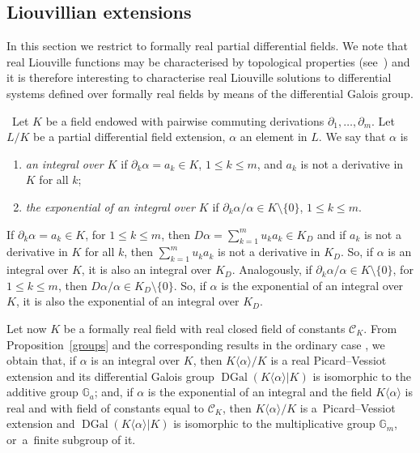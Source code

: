 \documentclass[10pt,a4paper]{amsart}
\numberwithin{equation}{section}
\newcommand{\G}{\mathbb{G}}
\def \DGal{\operatorname{DGal}}
\begin{document}
\subsection{Liouvillian extensions}\label{sLiou}

In this section we restrict to formally real partial differential fields. We note that real Liouville functions may be characterised by topological properties (see~\cite{GK}) and it is therefore interesting to characterise real Liouville solutions to differential systems defined over formally real fields by means of the differential Galois group.


\begin{Definition}\ Let $K$ be a field endowed with pairwise commuting derivations $\partial_1,\dots,\partial_m$. Let $L/K$ be a partial differential field extension, $\alpha$ an element in $L$. We say that $\alpha$ is
\begin{enumerate}\itemsep=0pt
\item[$-$] \emph{an integral over $K$} if $\partial_k \alpha = a_k \in K$, $1 \leq k \leq m$, and $a_k$ is not a derivative in $K$ for all $k$;
\item[$-$] \emph{the exponential of an integral over $K$} if $\partial_k \alpha/\alpha \in K\setminus \{0\}$, $1 \leq k \leq m$.
\end{enumerate}
\end{Definition}

\begin{Remark}\label{intexp}
If $\partial_k \alpha = a_k \in K$, for $1 \leq k \leq m$, then $D \alpha = \sum_{k=1}^m u_k a_k \in K_D$ and if $a_k$ is not a derivative in $K$ for all $k$, then $\sum_{k=1}^m u_k a_k$ is not a derivative in $K_D$. So, if $\alpha$ is an integral over $K$, it is also an integral over $K_D$. Analogously, if $\partial_k \alpha/\alpha \in K\setminus \{0\}$, for $1 \leq k \leq m$, then $D\alpha /\alpha \in K_D\setminus \{0\}$. So, if $\alpha$ is the exponential of an integral over $K$, it is also the exponential of an integral over $K_D$.
\end{Remark}

 Let now $K$ be a formally real field with real closed field of constants $\mathcal{C}_K$. From Proposition~\ref{groups} and the corresponding results in the ordinary case \cite[Examples~7 and~8]{CH}, we obtain that, if $\alpha$ is an integral over $K$, then $K\langle \alpha \rangle/K$ is a real Picard--Vessiot extension and its differential Galois group $\DGal(K\langle \alpha
\rangle|K)$ is isomorphic to the additive group $\G_a$; and, if $\alpha$ is the
exponential of an integral and the field $K\langle \alpha \rangle$ is real and with field of constants equal to $\mathcal{C}_K$, then $K\langle \alpha \rangle/K$ is a~Picard--Vessiot extension and $\DGal(K\langle \alpha
\rangle|K)$ is isomorphic to the multiplicative group $\G_m$, or~a~finite subgroup of it.
\end{document}
